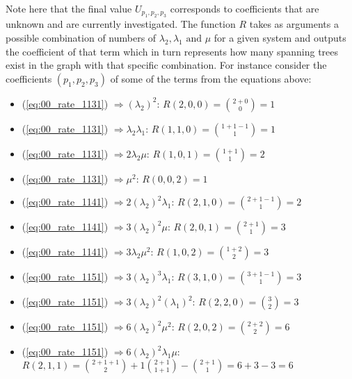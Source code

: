 Note here that the final value \(U_{p_1,p_2,p_3}\) corresponds to coefficients
that are unknown and are currently investigated.
The function \(R\) takes as arguments a possible combination of numbers of
\(\lambda_2, \lambda_1 \text{ and } \mu \) for a given system and outputs the
coefficient of that term which in turn represents how many spanning trees exist
in the graph with that specific combination.
For instance consider the coefficients \((p_1,p_2,p_3)\) of some of the terms
from the equations above:

\tiny
\begin{multicols}{2}
    \begin{itemize}
        \item (\ref{eq:00_rate_1131}) \( \Rightarrow (\lambda_2)^2\):
        \(R(2,0,0) = \binom{2+0}{0} = 1\)
        \item (\ref{eq:00_rate_1131}) \( \Rightarrow \lambda_2 \lambda_1\):
        \(R(1,1,0) = \binom{1+1-1}{1} = 1\)
        \item (\ref{eq:00_rate_1131}) \( \Rightarrow 2 \lambda_2 \mu\):
        \(R(1,0,1) = \binom{1+1}{1} = 2\)
        \item (\ref{eq:00_rate_1131}) \( \Rightarrow \mu^2\): \(R(0,0,2) = 1\)
        \item (\ref{eq:00_rate_1141}) \( \Rightarrow 2(\lambda_2)^2 \lambda_1\):
        \(R(2,1,0) = \binom{2+1-1}{1} = 2\)
        \item (\ref{eq:00_rate_1141}) \( \Rightarrow 3(\lambda_2)^2 \mu\):
        \(R(2,0,1) = \binom{2+1}{1} = 3\)
        \item (\ref{eq:00_rate_1141}) \( \Rightarrow 3 \lambda_2 \mu^2\):
        \(R(1,0,2) = \binom{1+2}{2} = 3\)
        \item (\ref{eq:00_rate_1151}) \( \Rightarrow 3 (\lambda_2)^3
        \lambda_1\): \(R(3,1,0) = \binom{3+1-1}{1} = 3\)
        \item (\ref{eq:00_rate_1151}) \( \Rightarrow 3 (\lambda_2)^2
        (\lambda_1)^2 \): \(R(2,2,0) = \binom{3}{2} = 3\)
        \item (\ref{eq:00_rate_1151}) \( \Rightarrow 6 (\lambda_2)^2 \mu ^ 2\):
        \(R(2,0,2) = \binom{2+2}{2} = 6\)
    \end{itemize}
\end{multicols}

\begin{itemize}
    \item (\ref{eq:00_rate_1151}) \( \Rightarrow 6 (\lambda_2)^2 \lambda_1 \mu\):
    \(R(2,1,1) = \binom{2+1+1}{2} + 1\binom{2+1}{1+1} - \binom{2+1}{1} =
    6 + 3 - 3 = 6\)
\end{itemize}
\small

